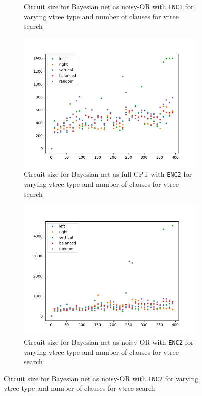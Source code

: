 \documentclass{article}
\begin{document}
\begin{figure}[h]
\begin{subfigure}[b]{0.4\linewidth}
    \caption{Circuit size for Bayesian net as noisy-OR with \texttt{ENC1} for varying vtree type and number of clauses for vtree search}
  \end{subfigure}
  \begin{subfigure}[b]{0.4\linewidth}
    \includegraphics[width=\linewidth]{images/standard_enc2_full.png}
    \caption{Circuit size for Bayesian net as full CPT with \texttt{ENC2} for varying vtree type and number of clauses for vtree search}
  \end{subfigure}
    \begin{subfigure}[b]{0.4\linewidth}
    \includegraphics[width=\linewidth]{images/standard_enc2_noisy.png}
    \caption{Circuit size for Bayesian net as noisy-OR with \texttt{ENC2} for varying vtree type and number of clauses for vtree search}
  \end{subfigure}
  \label{fig:circuits}
\end{figure}
\end{document}
